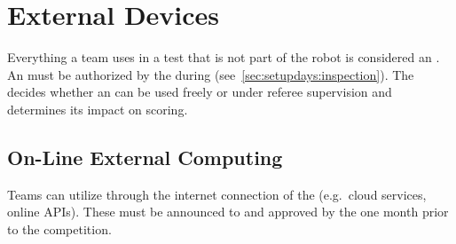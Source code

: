 %
%
\section{External Devices}
\label{sec:rules:externaldevices}
Everything a team uses in a test that is not part of the robot is considered an \ExternalDevice{}.
An \ExternalDevice{} must be authorized by the \TC{} during \RobotInspection{} (see~\ref{sec:setupdays:inspection}).
The  decides whether an \ExternalDevice{} can be used freely or under referee supervision and determines its impact on scoring.

\subsection{On-Line External Computing}
\label{sec:rules:onlineexternalcomputing}
Teams can utilize \ExternalComputing{} through the internet connection of the \ArenaNetwork{} (e.g.~cloud services, online APIs). These must be announced to and approved by the \TC{} one month prior to the competition.

